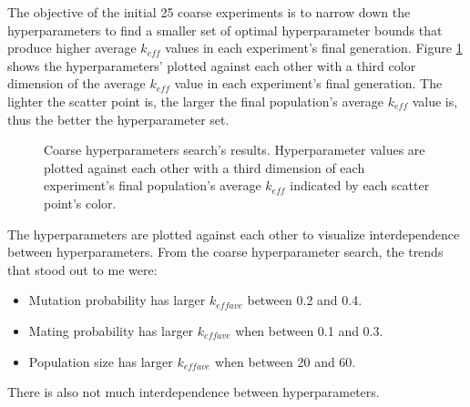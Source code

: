 The objective of the initial 25 coarse experiments is to narrow down the 
hyperparameters to find a smaller set of optimal hyperparameter bounds that 
produce higher average $k_{eff}$ values in each experiment's final generation. 
Figure \ref{fig:hyperparameter_sens} shows the hyperparameters' plotted against 
each other with a third color dimension of the average $k_{eff}$ value in each 
experiment's final generation. 
The lighter the scatter point is, the larger the final population's 
average $k_{eff}$ value is, thus the better the hyperparameter set. 
\begin{figure}[]
    \centering
    \caption{Coarse hyperparameters search's results. Hyperparameter values are plotted 
    against each other with a third dimension of each experiment's final population's 
    average $k_{eff}$ indicated by each scatter point's color.}
    \label{fig:hyperparameter_sens}
\end{figure}
The hyperparameters are plotted against each other to visualize interdependence 
between hyperparameters. 
From the coarse hyperparameter search, the trends that stood out to me were: 
\begin{itemize}
    \item Mutation probability has larger $k_{eff ave}$ between 0.2 and 0.4. 
    \item Mating probability has larger $k_{eff ave}$ when between 0.1 and 0.3. 
    \item Population size has larger $k_{eff ave}$ when between 20 and 60. 
\end{itemize}
There is also not much interdependence between hyperparameters. 

